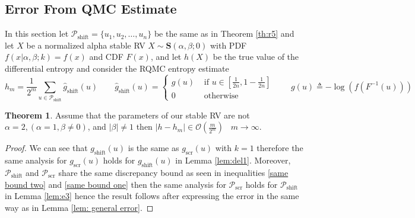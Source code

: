 \documentclass{article}
\theoremstyle{definition}
\newtheorem{theorem}[definition]{Theorem}
\begin{document}
    \subsection{Error From QMC Estimate}
    In this section   let $\mathcal{P}_{\text{shift}}=\{u_1,u_2,\ldots,u_n\}$ be the same as in Theorem \ref{th:r5} and let $X$ be a normalized alpha stable RV $X\sim\mathbf{S}(\alpha,\beta;0)$ with PDF $f(x|\alpha,\beta;k)=f(x)$ and CDF $F(x)$, and let $h(X)$ be the true value of the differential entropy and consider the RQMC entropy estimate \begin{equation}
    h_m=\frac{1}{2^m}\sum_{u\in\mathcal{P}_{\text{shift}}}\hat{g}_{\text{shift}}(u) \qquad 
\hat{g}_{\text{shift}}(u)=\begin{cases} g(u) & \text{ if } u \in \left[\frac{1}{2n} , 1-\frac{1}{2n}\right]\\
0 & \text{ otherwise }
    \end{cases}
\qquad g(u) \triangleq -\log(f(F^{-1}(u)))
\end{equation}
\begin{theorem}
Assume that the parameters of our stable RV are not $\alpha=2,(\alpha=1,\beta\neq0)$, and $\lvert \beta\rvert\neq 1$ then $\lvert h-h_m\rvert\in\mathcal{O}\left(\frac{m}{2^m}\right)\;\;\;m\to\infty$.
\end{theorem}
    \begin{proof}
We can see that $g_{\text{shift}}(u)$ is the same as $g_{\text{scr}}(u)$ with $k=1$ therefore the same analysis for $g_{\text{scr}}(u)$ holds for $g_{\text{shift}}(u)$  in Lemma \ref{lem:del1}. Moreover, $\mathcal{P}_{\text{shift}}$ and $\mathcal{P}_{\text{scr}}$ share the same discrepancy bound as seen in inequalities \eqref{same bound two} and \eqref{same bound one} then the same analysis for $\mathcal{P}_{\text{scr}}$  holds for $\mathcal{P}_{\text{shift}}$ in Lemma \ref{lem:e3}  hence the result follows after expressing the  error in the same way as in Lemma \ref{lem: general error}.    
    \end{proof}
\end{document}
